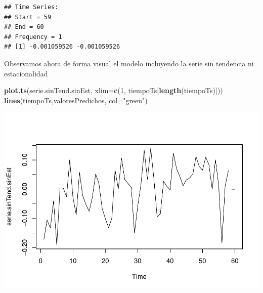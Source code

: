 \documentclass[]{article}
\newenvironment{Shaded}{\begin{snugshade}}{\end{snugshade}}
\newcommand{\KeywordTok}[1]{\textcolor[rgb]{0.13,0.29,0.53}{\textbf{#1}}}
\newcommand{\DataTypeTok}[1]{\textcolor[rgb]{0.13,0.29,0.53}{#1}}
\newcommand{\DecValTok}[1]{\textcolor[rgb]{0.00,0.00,0.81}{#1}}
\newcommand{\StringTok}[1]{\textcolor[rgb]{0.31,0.60,0.02}{#1}}
\newcommand{\CommentTok}[1]{\textcolor[rgb]{0.56,0.35,0.01}{\textit{#1}}}
\newcommand{\OperatorTok}[1]{\textcolor[rgb]{0.81,0.36,0.00}{\textbf{#1}}}
\newcommand{\NormalTok}[1]{#1}
\begin{document}
\begin{Shaded}
\end{Shaded}

\begin{verbatim}
## Time Series:
## Start = 59 
## End = 60 
## Frequency = 1 
## [1] -0.001059526 -0.001059526
\end{verbatim}

Observamos ahora de forma visual el modelo incluyendo la serie sin
tendencia ni estacionalidad

\begin{Shaded}
\begin{Highlighting}[]
\KeywordTok{plot.ts}\NormalTok{(serie.sinTend.sinEst, }\DataTypeTok{xlim=}\KeywordTok{c}\NormalTok{(}\DecValTok{1}\NormalTok{, tiempoTs[}\KeywordTok{length}\NormalTok{(tiempoTs)])) }
\KeywordTok{lines}\NormalTok{(tiempoTs,valoresPredichos, }\DataTypeTok{col=}\StringTok{"green"}\NormalTok{)}
\end{Highlighting}
\end{Shaded}

\includegraphics{timeSeries_files/figure-latex/unnamed-chunk-25-1.pdf}
\end{document}
